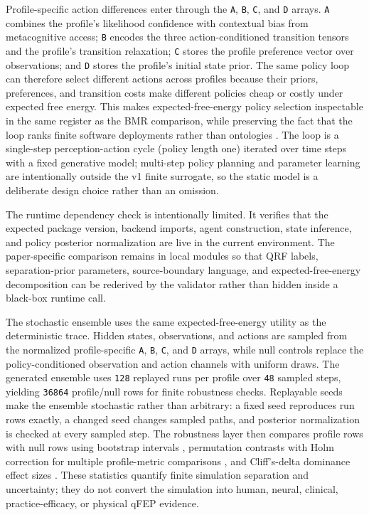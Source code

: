 \documentclass[
]{article}
\begin{document}
Profile-specific action differences enter through the \texttt{A},
\texttt{B}, \texttt{C}, and \texttt{D} arrays. \texttt{A} combines the
profile's likelihood confidence with contextual bias from metacognitive
access; \texttt{B} encodes the three action-conditioned transition
tensors and the profile's transition relaxation; \texttt{C} stores the
profile preference vector over observations; and \texttt{D} stores the
profile's initial state prior. The same policy loop can therefore select
different actions across profiles because their priors, preferences, and
transition costs make different policies cheap or costly under expected
free energy. This makes expected-free-energy policy selection
inspectable in the same register as the BMR comparison, while preserving
the fact that the loop ranks finite software deployments rather than
ontologies \citep{friston2015epistemic, parr2022active}. The loop is a
single-step perception-action cycle (policy length one) iterated over
time steps with a fixed generative model; multi-step policy planning and
parameter learning are intentionally outside the v1 finite surrogate, so
the static model is a deliberate design choice rather than an omission.

The runtime dependency check is intentionally limited. It verifies that
the expected package version, backend imports, agent construction, state
inference, and policy posterior normalization are live in the current
environment. The paper-specific comparison remains in local modules so
that QRF labels, separation-prior parameters, source-boundary language,
and expected-free-energy decomposition can be rederived by the validator
rather than hidden inside a black-box runtime call.

The stochastic ensemble uses the same expected-free-energy utility as
the deterministic trace. Hidden states, observations, and actions are
sampled from the normalized profile-specific \texttt{A}, \texttt{B},
\texttt{C}, and \texttt{D} arrays, while null controls replace the
policy-conditioned observation and action channels with uniform draws.
The generated ensemble uses \texttt{128} replayed runs per profile over
\texttt{48} sampled steps, yielding \texttt{36864} profile/null rows for
finite robustness checks. Replayable seeds make the ensemble stochastic
rather than arbitrary: a fixed seed reproduces run rows exactly, a
changed seed changes sampled paths, and posterior normalization is
checked at every sampled step. The robustness layer then compares
profile rows with null rows using bootstrap intervals
\citep{efron1979bootstrap}, permutation contrasts with Holm correction
for multiple profile-metric comparisons \citep{holm1979sequential}, and
Cliff's-delta dominance effect sizes \citep{cliff1993dominance}. These
statistics quantify finite simulation separation and uncertainty; they
do not convert the simulation into human, neural, clinical,
practice-efficacy, or physical qFEP evidence.
\end{document}
